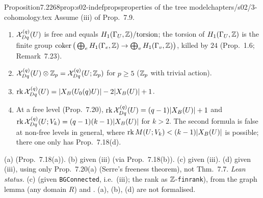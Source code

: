\begin{quoted}{Proposition}{7.22}{68}{prop:s02-indefprops}{properties of the tree model}{chapters/s02/3-cohomology.tex}\label{rpt:prop:s02-indefprops}
Assume (iii) of Prop.~7.9.
\begin{enumerate}[label=(\alph*)]
\item $\mathcal{X}^{(q)}_{Dq}(U)$ is free and equals $H_1(\Gamma_U,\mathbb{Z})/\mathrm{torsion}$; the torsion of $H_1(\Gamma_U,\mathbb{Z})$ is the finite group
  $\operatorname{coker}\big(\bigoplus_eH_1(\Gamma_e,\mathbb{Z})\to\bigoplus_vH_1(\Gamma_v,\mathbb{Z})\big)$, killed by $24$ (Prop.~1.6; Remark~7.23).
\item $\mathcal{X}^{(q)}_{Dq}(U)\otimes\mathbb{Z}_p=\mathcal{X}^{(q)}_{Dq}(U;\mathbb{Z}_p)$ for $p\ge5$ ($\mathbb{Z}_p$ with trivial action).
\item $\operatorname{rk}\mathcal{X}^{(q)}_{Dq}(U)=|X_B(U_0(q)U)|-2|X_B(U)|+1$.
\item At a free level (Prop.~7.20), $\operatorname{rk}\mathcal{X}^{(q)}_{Dq}(U)=(q-1)|X_B(U)|+1$ and
  $\operatorname{rk}\mathcal{X}^{(q)}_{Dq}(U;V_k)=(q-1)(k-1)|X_B(U)|$ for $k>2$. The second formula is false at non-free levels in general, where
  $\operatorname{rk}M(U;V_k)<(k-1)|X_B(U)|$ is possible; there one only has Prop.~7.18(d).
\end{enumerate}
\par\smallskip{}\par
\noindent (a) \stpmc{} (Prop.~7.18(a)). (b) \stpmc{} given (iii) (via Prop.~7.18(b)). (c) \stproved{} given (iii). (d) \stpmc{} given (iii), using only Prop.~7.20(a) (Serre's
freeness theorem), not Thm.~7.7. \emph{Lean status.} (c) \stformal{} 
(given \texttt{BGConnected}, i.e.\ (iii); the rank as $\mathbb{Z}$-\texttt{finrank}), from the graph lemma
 (any domain $R$) and .
(a), (b), (d) are not formalised.
\end{quoted}
